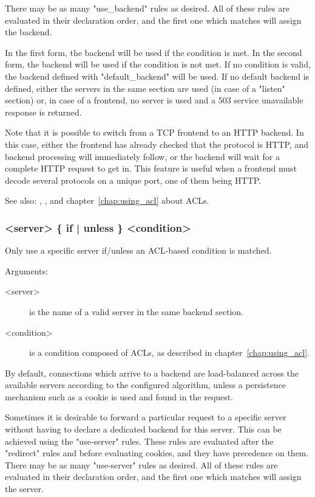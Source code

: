   There may be as many "use\_backend" rules as desired. All of these rules are
  evaluated in their declaration order, and the first one which matches will
  assign the backend.

  In the first form, the backend will be used if the condition is met. In the
  second form, the backend will be used if the condition is not met. If no
  condition is valid, the backend defined with "default\_backend" will be used.
  If no default backend is defined, either the servers in the same section are
  used (in case of a "listen" section) or, in case of a frontend, no server is
  used and a 503 service unavailable response is returned.

  Note that it is possible to switch from a TCP frontend to an HTTP backend. In
  this case, either the frontend has already checked that the protocol is HTTP,
  and backend processing will immediately follow, or the backend will wait for
  a complete HTTP request to get in. This feature is useful when a frontend
  must decode several protocols on a unique port, one of them being HTTP.


See also: , , and chapter~\ref{chap:using_acl} about ACLs.

\subsubsection[use-server]{ <server> \{ if | unless \} <condition>}

  Only use a specific server if/unless an ACL-based condition is matched.


  Arguments:
  \begin{description}
  \item[<server>] is the name of a valid server in the same backend section.
  \item[<condition>] is a condition composed of ACLs, as described in chapter~\ref{chap:using_acl}.
  \end{description}

  By default, connections which arrive to a backend are load-balanced across
  the available servers according to the configured algorithm, unless a
  persistence mechanism such as a cookie is used and found in the request.

  Sometimes it is desirable to forward a particular request to a specific
  server without having to declare a dedicated backend for this server. This
  can be achieved using the "use-server" rules. These rules are evaluated after
  the "redirect" rules and before evaluating cookies, and they have precedence
  on them. There may be as many "use-server" rules as desired. All of these
  rules are evaluated in their declaration order, and the first one which
  matches will assign the server.

